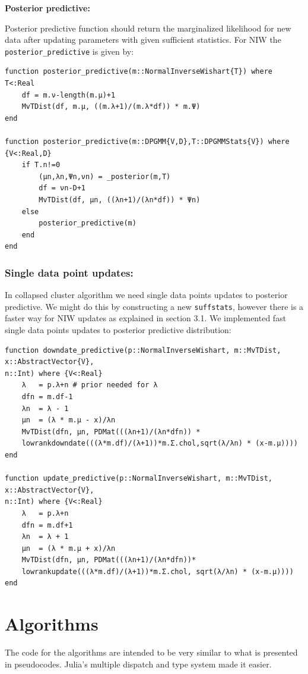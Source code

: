 \documentclass[a4paper]{article}
\begin{document}
\textbf{Posterior predictive:}

Posterior predictive function should return the marginalized likelihood
for new data after updating parameters with given sufficient statistics.
For NIW the \texttt{posterior\_predictive} is given by:

\begin{lstlisting}
function posterior_predictive(m::NormalInverseWishart{T}) where T<:Real
    df = m.ν-length(m.μ)+1
    MvTDist(df, m.μ, ((m.λ+1)/(m.λ*df)) * m.Ψ)
end

function posterior_predictive(m::DPGMM{V,D},T::DPGMMStats{V}) where {V<:Real,D}
    if T.n!=0
        (μn,λn,Ψn,νn) = _posterior(m,T)
        df = νn-D+1
        MvTDist(df, μn, ((λn+1)/(λn*df)) * Ψn)
    else
        posterior_predictive(m)
    end
end
\end{lstlisting}

\subsubsection{Single data point updates:}

In collapsed cluster algorithm we need single data points updates to
posterior predictive. We might do this by constructing a new
\texttt{suffstats}, however there is a faster way for NIW updates as
explained in section 3.1. We implemented fast single data points updates
to posterior predictive distribution:
\begin{lstlisting}[linewidth=17cm]
function downdate_predictive(p::NormalInverseWishart, m::MvTDist, x::AbstractVector{V}, 
n::Int) where {V<:Real}
    λ   = p.λ+n # prior needed for λ
    dfn = m.df-1
    λn  = λ - 1
    μn  = (λ * m.μ - x)/λn
    MvTDist(dfn, μn, PDMat(((λn+1)/(λn*dfn)) * 
    lowrankdowndate(((λ*m.df)/(λ+1))*m.Σ.chol,sqrt(λ/λn) * (x-m.μ))))
end

function update_predictive(p::NormalInverseWishart, m::MvTDist, x::AbstractVector{V}, 
n::Int) where {V<:Real}
    λ   = p.λ+n 
    dfn = m.df+1
    λn  = λ + 1
    μn  = (λ * m.μ + x)/λn
    MvTDist(dfn, μn, PDMat(((λn+1)/(λn*dfn))*
    lowrankupdate(((λ*m.df)/(λ+1))*m.Σ.chol, sqrt(λ/λn) * (x-m.μ))))
end
\end{lstlisting}



\section{Algorithms}

The code for the algorithms are intended to be very similar to what is
presented in pseudocodes. Julia's multiple dispatch and type system made
it easier.
\end{document}
